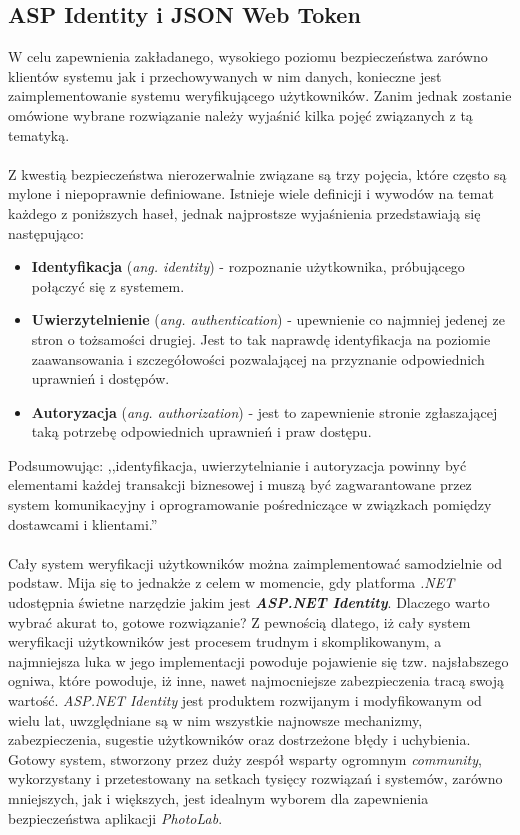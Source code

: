 \subsection{ASP Identity i JSON Web Token}
    W celu zapewnienia zakładanego, wysokiego poziomu bezpieczeństwa zarówno klientów systemu jak i przechowywanych w nim danych, konieczne jest zaimplementowanie systemu weryfikującego użytkowników. Zanim jednak zostanie omówione wybrane rozwiązanie należy wyjaśnić kilka pojęć związanych z tą tematyką.\\
    \\
    Z kwestią bezpieczeństwa nierozerwalnie związane są trzy pojęcia, które często są mylone i niepoprawnie definiowane. Istnieje wiele definicji i wywodów na temat każdego z poniższych haseł, jednak najprostsze wyjaśnienia przedstawiają się następująco:
    \begin{itemize}
        \item \textbf{Identyfikacja} (\textit{ang. identity}) - rozpoznanie użytkownika, próbującego połączyć się z systemem.
        \item \textbf{Uwierzytelnienie} (\textit{ang. authentication}) - upewnienie co najmniej jedenej ze stron o tożsamości drugiej. Jest to tak naprawdę identyfikacja na poziomie zaawansowania i szczegółowości pozwalającej na przyznanie odpowiednich uprawnień i dostępów.
        \item \textbf{Autoryzacja} (\textit{ang. authorization}) - jest to zapewnienie stronie zgłaszającej taką potrzebę odpowiednich uprawnień i praw dostępu. 
    \end{itemize}
    Podsumowując: ,,identyfikacja, uwierzytelnianie i autoryzacja powinny być elementami każdej transakcji biznesowej i muszą być zagwarantowane przez system komunikacyjny i oprogramowanie pośredniczące w związkach pomiędzy dostawcami i klientami.'' \cite{identity-theory}\\
    \\
    Cały system weryfikacji użytkowników można zaimplementować samodzielnie od podstaw. Mija się to jednakże z celem w momencie, gdy platforma \textit{.NET} udostępnia świetne narzędzie jakim jest \textbf{\textit{ASP.NET Identity}}. Dlaczego warto wybrać akurat to, gotowe rozwiązanie? Z pewnością dlatego, iż cały system weryfikacji użytkowników jest procesem trudnym i skomplikowanym, a najmniejsza luka w jego implementacji powoduje pojawienie się tzw. najsłabszego ogniwa, które powoduje, iż inne, nawet najmocniejsze zabezpieczenia tracą swoją wartość. \textit{ASP.NET Identity} jest produktem rozwijanym i modyfikowanym od wielu lat, uwzględniane są w nim wszystkie najnowsze mechanizmy, zabezpieczenia, sugestie użytkowników oraz dostrzeżone błędy i uchybienia. Gotowy system, stworzony przez duży zespół wsparty ogromnym \textit{community}, wykorzystany i przetestowany na setkach tysięcy rozwiązań i systemów, zarówno mniejszych, jak i większych, jest idealnym wyborem dla zapewnienia bezpieczeństwa aplikacji \textit{PhotoLab}.\\
